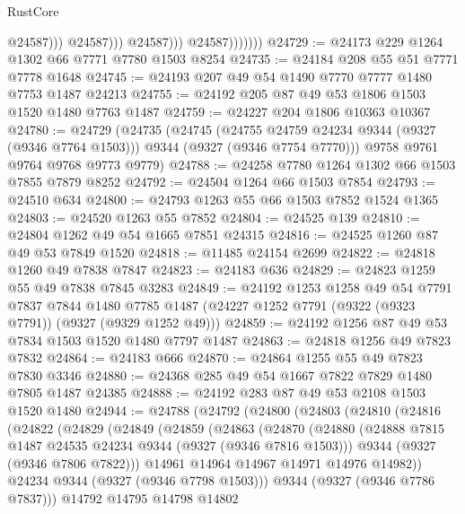\begin{lexlean}{RustCore}
\begin{coremodule}
                                    @24587)))
                              @24587)))
                        @24587)))
                  @24587)))))))
@24729 := @24173 @229 @1264 @1302 @66 @7771 @7780 @1503 @8254
@24735 := @24184 @208 @55 @51 @7771 @7778 @1648
@24745 := @24193 @207 @49 @54 @1490 @7770 @7777 @1480 @7753 @1487 @24213
@24755 := @24192 @205 @87 @49 @53 @1806 @1503 @1520 @1480 @7763 @1487
@24759 := @24227 @204 @1806 @10363 @10367
@24780 := @24729
    (@24735
      (@24745
        (@24755 @24759 @24234 @9344 (@9327 (@9346 @7764 @1503)))
        @9344
        (@9327 (@9346 @7754 @7770)))
      @9758
      @9761
      @9764
      @9768
      @9773
      @9779)
@24788 := @24258 @7780 @1264 @1302 @66 @1503 @7855 @7879 @8252
@24792 := @24504 @1264 @66 @1503 @7854
@24793 := @24510 @634
@24800 := @24793 @1263 @55 @66 @1503 @7852 @1524 @1365
@24803 := @24520 @1263 @55 @7852
@24804 := @24525 @139
@24810 := @24804 @1262 @49 @54 @1665 @7851 @24315
@24816 := @24525 @1260 @87 @49 @53 @7849 @1520
@24818 := @11485 @24154 @2699
@24822 := @24818 @1260 @49 @7838 @7847
@24823 := @24183 @636
@24829 := @24823 @1259 @55 @49 @7838 @7845 @3283
@24849 := @24192
    @1253
    @1258
    @49
    @54
    @7791
    @7837
    @7844
    @1480
    @7785
    @1487
    (@24227 @1252 @7791 (@9322 (@9323 @7791)) (@9327 (@9329 @1252 @49)))
@24859 := @24192 @1256 @87 @49 @53 @7834 @1503 @1520 @1480 @7797 @1487
@24863 := @24818 @1256 @49 @7823 @7832
@24864 := @24183 @666
@24870 := @24864 @1255 @55 @49 @7823 @7830 @3346
@24880 := @24368 @285 @49 @54 @1667 @7822 @7829 @1480 @7805 @1487 @24385
@24888 := @24192 @283 @87 @49 @53 @2108 @1503 @1520 @1480
@24944 := @24788
    (@24792
      (@24800
        (@24803
          (@24810
            (@24816
              (@24822
                (@24829
                  (@24849
                    (@24859
                      (@24863
                        (@24870
                          (@24880
                            (@24888 @7815 @1487 @24535 @24234 @9344 (@9327 (@9346 @7816 @1503)))
                            @9344
                            (@9327 (@9346 @7806 @7822)))
                          @14961
                          @14964
                          @14967
                          @14971
                          @14976
                          @14982))
                      @24234
                      @9344
                      (@9327 (@9346 @7798 @1503)))
                    @9344
                    (@9327 (@9346 @7786 @7837)))
                  @14792
                  @14795
                  @14798
                  @14802

\end{coremodule}
\end{lexlean}
